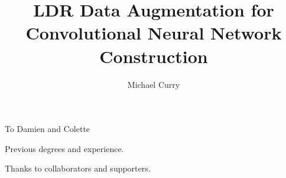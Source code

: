 \documentclass[12pt,leqno]{report}
\begin{document}
\sloppy
\title{LDR Data Augmentation for Convolutional Neural Network Construction}
\author{Michael Curry}
\maketitle


\thispagestyle{plain}
\newenvironment{dedication}
{\cleardoublepage {}
  \begin{center} \em}
  {\end{center}  }
\begin{dedication}

   To Damien and Colette

\end{dedication}

\tableofcontents
\listoftables
\listoffigures

\begin{curriculumvitae}

  Previous degrees and experience.

\end{curriculumvitae}

\begin{acknowledgments}

  Thanks to collaborators and supporters.


 
\end{acknowledgments}
\end{document}
